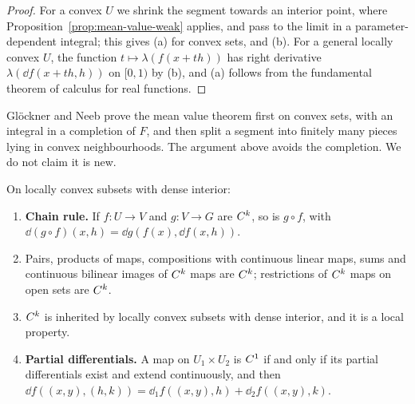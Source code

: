 \begin{proof}
  \leanok
  For a convex $U$ we shrink the segment towards an interior point, where
  Proposition~\ref{prop:mean-value-weak} applies, and pass to the limit in a parameter-dependent
  integral; this gives (a) for convex sets, and (b). For a general locally convex $U$, the
  function $t \mapsto \lambda(f(x + th))$ has right derivative $\lambda(\dd f(x + th, h))$ on
  $[0, 1)$ by (b), and (a) follows from the fundamental theorem of calculus for real functions.
\end{proof}

\begin{remark}
  Glöckner and Neeb prove the mean value theorem first on convex sets, with an integral in a
  completion of $F$, and then split a segment into finitely many pieces lying in convex
  neighbourhoods. The argument above avoids the completion. We do not claim it is new.
\end{remark}

\begin{theorem}
  \label{thm:lc-rules}
  \leanok
  On locally convex subsets with dense interior:
  \begin{enumerate}
    \item \textbf{Chain rule.} If $f \colon U \to V$ and $g \colon V \to G$ are $C^{k}$, so is
      $g \circ f$, with $\dd(g \circ f)(x, h) = \dd g(f(x), \dd f(x, h))$.
    \item Pairs, products of maps, compositions with continuous linear maps, sums and continuous
      bilinear images of $C^{k}$ maps are $C^{k}$; restrictions of $C^{k}$ maps on open sets
      are $C^{k}$.
    \item $C^{k}$ is inherited by locally convex subsets with dense interior, and it is a local
      property.
    \item \textbf{Partial differentials.} A map on $U_1 \times U_2$ is $C^{1}$ if and only if its
      partial differentials exist and extend continuously, and then
      $\dd f((x, y), (h, k)) = \dd_1 f((x, y), h) + \dd_2 f((x, y), k)$.
  \end{enumerate}
\end{theorem}

